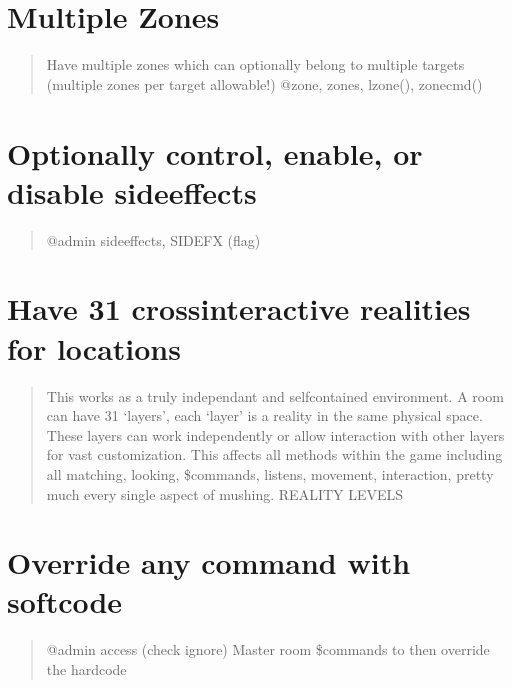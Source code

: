 \documentclass[letterpaper,10pt,english]{sphinxmanual}
\begin{document}
\section{Multiple Zones}
\label{\detokenize{01-intro:multiple-zones}}\begin{quote}

\sphinxAtStartPar
Have multiple zones which can optionally belong to
multiple targets (multiple zones per target allowable!)
@zone, zones, lzone(), zonecmd()
\end{quote}


\section{Optionally control, enable, or disable sideeffects}
\label{\detokenize{01-intro:optionally-control-enable-or-disable-sideeffects}}\begin{quote}

\sphinxAtStartPar
@admin sideeffects, SIDEFX (flag)
\end{quote}


\section{Have 31 cross\sphinxhyphen{}interactive realities for locations}
\label{\detokenize{01-intro:have-31-cross-interactive-realities-for-locations}}\begin{quote}

\sphinxAtStartPar
This works as a truly independant and self\sphinxhyphen{}contained environment.
A room can have 31 ‘layers’, each ‘layer’ is a reality in
the same physical space.  These layers can work independently
or allow interaction with other layers for vast customization.
This affects all methods within the game including all matching,
looking, \$commands, listens, movement, interaction, pretty
much every single aspect of mushing.
REALITY LEVELS
\end{quote}


\section{Override any command with softcode}
\label{\detokenize{01-intro:override-any-command-with-softcode}}\begin{quote}

\sphinxAtStartPar
@admin access (check ignore)
Master room \$commands to then override the hardcode
\end{quote}
\end{document}
